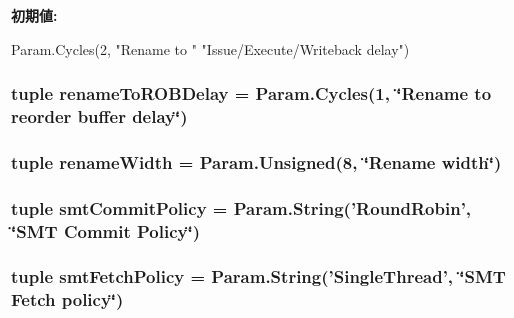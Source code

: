 \label{classO3CPU_1_1DerivO3CPU_acdec10386abd09a4724775d533fc65d4}
{\bfseries 初期値:}
\begin{DoxyCode}
Param.Cycles(2, "Rename to "
               "Issue/Execute/Writeback delay")
\end{DoxyCode}
\hypertarget{classO3CPU_1_1DerivO3CPU_a1c17c9a7d634b03c7c2b7c0ba0ca21b9}{
\subsubsection[{renameToROBDelay}]{\setlength{\rightskip}{0pt plus 5cm}tuple {\bf renameToROBDelay} = Param.Cycles(1, \char`\"{}Rename to reorder buffer delay\char`\"{})}}
\label{classO3CPU_1_1DerivO3CPU_a1c17c9a7d634b03c7c2b7c0ba0ca21b9}
\hypertarget{classO3CPU_1_1DerivO3CPU_a6500ae95e23f48433d63280c42925a31}{
\subsubsection[{renameWidth}]{\setlength{\rightskip}{0pt plus 5cm}tuple {\bf renameWidth} = Param.Unsigned(8, \char`\"{}Rename width\char`\"{})}}
\label{classO3CPU_1_1DerivO3CPU_a6500ae95e23f48433d63280c42925a31}
\hypertarget{classO3CPU_1_1DerivO3CPU_aaba9a761fafbefed59136db55af6bd6a}{
\subsubsection[{smtCommitPolicy}]{\setlength{\rightskip}{0pt plus 5cm}tuple {\bf smtCommitPolicy} = Param.String('RoundRobin', \char`\"{}SMT Commit Policy\char`\"{})}}
\label{classO3CPU_1_1DerivO3CPU_aaba9a761fafbefed59136db55af6bd6a}
\hypertarget{classO3CPU_1_1DerivO3CPU_a349052a4ccb84410a8e2ae982cdf1bbc}{
\subsubsection[{smtFetchPolicy}]{\setlength{\rightskip}{0pt plus 5cm}tuple {\bf smtFetchPolicy} = Param.String('SingleThread', \char`\"{}SMT Fetch policy\char`\"{})}}

